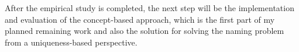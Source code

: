 
After the empirical study is completed, the next step will be the implementation and evaluation of the concept-based approach, which is the first part of my planned remaining work and also the solution for solving the naming problem from a uniqueness-based perspective.